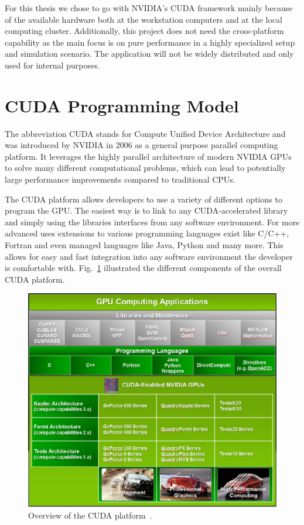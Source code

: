 For this thesis we chose to go with NVIDIA's CUDA framework mainly because of the available hardware both at the workstation computers and at the local computing cluster. Additionally, this project does not need the cross-platform capability as the main focus is on pure performance in a highly specialized setup and simulation scenario. The application will not be widely distributed and only used for internal purposes.

\section{CUDA Programming Model}
\label{sec:CUDA}
The abbreviation CUDA stands for Compute Unified Device Architecture and was introduced by NVIDIA in 2006 as a general purpose parallel computing platform. It leverages the highly parallel architecture of modern NVIDIA GPUs to solve many different computational problems, which can lead to potentially large performance improvements compared to traditional CPUs.

The CUDA platform allows developers to use a variety of different options to program the GPU. The easiest way is to link to any CUDA-accelerated library and simply using the libraries interfaces from any software environment. For more advanced uses extensions to various programming languages exist like C/C++, Fortran and even managed languages like Java, Python and many more. This allows for easy and fast integration into any software environment the developer is comfortable with. Fig.~\ref{fig:cuda_overview} illustrated the different components of the overall CUDA platform.

\begin{figure}[!htbp]
  \centering
  \includegraphics[width=.9\textwidth]{img/cuda_overview.pdf}
  \caption[Overview of the CUDA platform.]{Overview of the CUDA platform~\cite{CudaProgrammingGuide}.}
  \label{fig:cuda_overview}
\end{figure}

